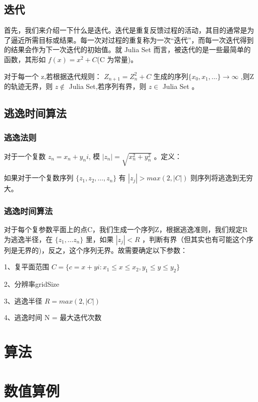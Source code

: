 \documentclass{ctexart}
\begin{document}
\subsection{迭代}

首先，我们来介绍一下什么是迭代。迭代是重复反馈过程的活动，其目的通常是为了逼近所需目标或结果。每一次对过程的重复称为一次“迭代”，而每一次迭代得到的结果会作为下一次迭代的初始值。就 Julia Set 而言，被迭代的是一些最简单的函数，其形如 $f(x) = x^2 + C$(C 为常量)。

对于每一个 z,若根据迭代规则： $Z_{n+1} = Z_n^2 + C$ 生成的序列$\{x_0, x_1,\dots\} \rightarrow \infty$ ,则Z的轨迹无界，则 $z \notin$  Julia Set,若序列有界，则 $z \in$ Julia Set 。

\subsection{逃逸时间算法}
\subsubsection{逃逸法则}

对于一个复数 $z_n = x_n + y_ni$, 模 $|z_n| = \sqrt{x_n^2 + y_n^2}$ 。定义：

如果对于一个复数序列 $\{z_1, z_2, \dots, z_n\}$ 有 $|z_j| > max(2,|C|)$ 则序列将逃逸到无穷大。

\subsubsection{逃逸时间算法}

对于每个复参数平面上的点C，我们生成一个序列Z，根据逃逸准则，我们规定R为逃逸半径，在 $\{z_1, \dots z_n\}$ 里，如果 $|z_j| < R$ ，判断有界（但其实也有可能这个序列是无界的)，反之，这个序列无界。故需要确定以下参数：

1、复平面范围 $C = \{c = x + yi: x_1 \le x \le x_2, y_1 \le y \le y_2 \}$
  
2、分辨率gridSize

3、逃逸半径 $R = max(2, |C|)$

4、逃逸时间 N = 最大迭代次数

\section{算法}

\section{数值算例}
\end{document}
